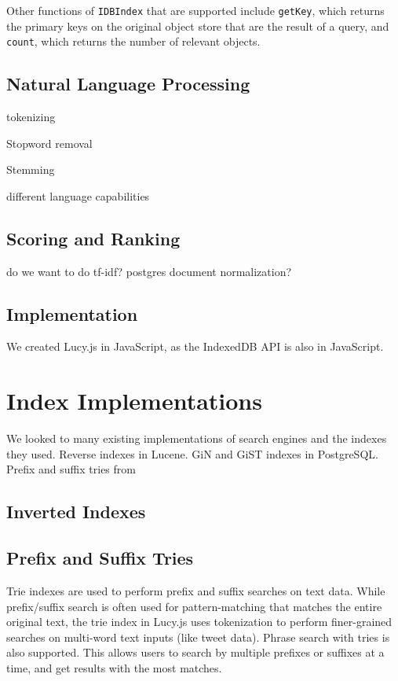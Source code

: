 \documentclass{vldb}
\begin{document}
Other functions of \texttt{IDBIndex} that are supported include \texttt{getKey}, which returns the primary keys on the original object store that are the result of a query, and \texttt{count}, which returns the number of relevant objects.


\subsection{Natural Language Processing}

tokenizing

Stopword removal

Stemming

different language capabilities

\subsection{Scoring and Ranking}

do we want to do tf-idf? postgres document normalization?




\subsection{Implementation}

We created Lucy.js in JavaScript, as the IndexedDB API is also in JavaScript. 




\section{Index Implementations}

We looked to many existing implementations of search engines and the indexes they used. Reverse indexes in Lucene. GiN and GiST indexes in PostgreSQL. Prefix and suffix tries from 

\subsection{Inverted Indexes}

\subsection{Prefix and Suffix Tries}

Trie indexes are used to perform prefix and suffix searches on text data. While prefix/suffix search is often used for pattern-matching that matches the entire original text, the trie index in Lucy.js uses tokenization to perform finer-grained searches on multi-word text inputs (like tweet data). Phrase search with tries is also supported. This allows users to search by multiple prefixes or suffixes at a time, and get results with the most matches.
\end{document}
